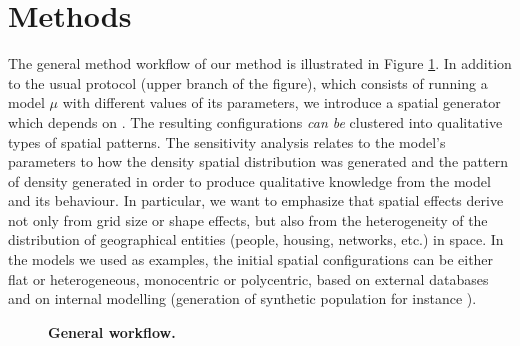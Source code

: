 \documentclass[preprint,5p,times,twocolumn,authoryear]{elsarticle}
\begin{document}
\section{Methods}

The general method workflow of our method is illustrated in Figure \ref{fig:method}. In addition to the usual protocol (upper branch of the figure), which consists of running a model $\mu$ with different values of its parameters, we introduce a spatial generator which depends on . The resulting configurations \emph{can be} clustered into qualitative types of spatial patterns. The sensitivity analysis relates to the model's parameters to how the density spatial distribution was generated and the pattern of density generated in order to produce qualitative knowledge from the model and its behaviour. In particular, we want to emphasize that spatial effects derive not only from grid size or shape effects, but also from the heterogeneity of the distribution of geographical entities (people, housing, networks, etc.) in space. In the models we used as examples, the initial spatial configurations can be either flat or heterogeneous, monocentric or polycentric, based on external databases and on internal modelling (generation of synthetic population for instance \citep{bhat1999activity}).
\begin{figure}[htbp] 
\begin{center} 
 \caption{\textbf{General workflow.}} \label{fig:method}
\end{center}
\end{figure} %
\end{document}
